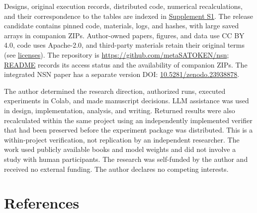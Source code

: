 \documentclass[10pt,a4paper]{article}
\begin{document}
Designs, original execution records, distributed code, numerical recalculations, and their correspondence to the tables are indexed in \href{https://github.com/metaSATOKEN/nsn/blob/c37d39ea0106274d9f661cfbb268b0ed05319846/papers/loop-kv/evidence-index-en-v0.3-2026-10-08.md}{Supplement S1}. The release candidate contains pinned code, materials, logs, and hashes, with large saved arrays in companion ZIPs. Author-owned papers, figures, and data use CC BY 4.0, code uses Apache-2.0, and third-party materials retain their original terms (see \href{https://github.com/metaSATOKEN/nsn/blob/c37d39ea0106274d9f661cfbb268b0ed05319846/LICENSES.md}{licenses}). The repository is \url{https://github.com/metaSATOKEN/nsn}; \href{https://github.com/metaSATOKEN/nsn/blob/c37d39ea0106274d9f661cfbb268b0ed05319846/README.md}{README} records its access status and the availability of companion ZIPs. The integrated NSN paper has a separate version DOI: \href{https://doi.org/10.5281/zenodo.23938878}{10.5281/zenodo.23938878}.

The author determined the research direction, authorized runs, executed experiments in Colab, and made manuscript decisions. LLM assistance was used in design, implementation, analysis, and writing. Returned results were also recalculated within the same project using an independently implemented verifier that had been preserved before the experiment package was distributed. This is a within-project verification, not replication by an independent researcher. The work used publicly available books and model weights and did not involve a study with human participants. The research was self-funded by the author and received no external funding. The author declares no competing interests.

\clearpage

\begingroup\raggedright\section{References}\label{references}
\end{document}
